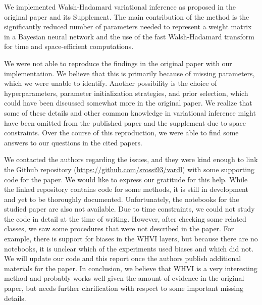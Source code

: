 We implemented Walsh-Hadamard variational inference as proposed in the original paper and its Supplement.
The main contribution of the method is the significantly reduced number of parameters needed to represent a weight matrix in a Bayesian neural network and the use of the fast Walsh-Hadamard transform for time and space-efficient computations.

We were not able to reproduce the findings in the original paper with our implementation.
We believe that this is primarily because of missing parameters, which we were unable to identify.
Another possibility is the choice of hyperparameters, parameter initialization strategies, and prior selection, which could have been discussed somewhat more in the original paper.
We realize that some of these details and other common knowledge in variational inference might have been omitted from the published paper and the supplement due to space constraints.
Over the course of this reproduction, we were able to find some answers to our questions in the cited papers.

We contacted the authors regarding the issues, and they were kind enough to link the Github repository (\url{https://github.com/srossi93/vardl}) with some supporting code for the paper.
We would like to express our gratitude for this help.
While the linked repository contains code for some methods, it is still in development and yet to be thoroughly documented.
Unfortunately, the notebooks for the studied paper are also not available.
Due to time constraints, we could not study the code in detail at the time of writing.
However, after checking some related classes, we saw some procedures that were not described in the paper.
For example, there is support for biases in the WHVI layers, but because there are no notebooks, it is unclear which of the experiments used biases and which did not.
We will update our code and this report once the authors publish additional materials for the paper.
In conclusion, we believe that WHVI is a very interesting method and probably works well given the amount of evidence in the original paper, but needs further clarification with respect to some important missing details.
